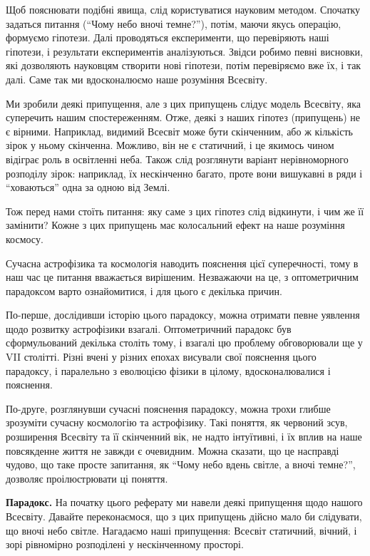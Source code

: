 \documentclass[a4paper]{article}
\begin{document}
Щоб пояснювати подібні явища, слід користуватися науковим методом. Спочатку задаться питання (``Чому небо вночі темне?''), потім, маючи якусь операцію, формуємо гіпотези. Далі проводяться експерименти, що перевіряють наші гіпотези, і результати експериментів аналізуються. Звідси робимо певні висновки, які дозволяють науковцям створити нові гіпотези, потім перевіряємо вже їх, і так далі. Саме так ми вдосконалюємо наше розуміння Всесвіту.

Ми зробили деякі припущення, але з цих припущень слідує модель Всесвіту, яка суперечить нашим спостереженням. Отже, деякі з наших гіпотез (припущень) не є вірними. Наприклад, видимий Всесвіт може бути скінченним, або ж кількість зірок у ньому скінченна. Можливо, він не є статичний, і це якимось чином відіграє роль в освітленні неба. Також слід розглянути варіант нерівноморного розподілу зірок: наприклад, їх нескінченно багато, проте вони вишукавні в ряди і ``ховаються'' одна за одною від Землі. \cite{relativityFAQ}

Тож перед нами стоїть питання: яку саме з цих гіпотез слід відкинути, і чим же її замінити? Кожне з цих припущень має колосальний ефект на наше розуміння космосу.

Сучасна астрофізика та космологія наводить пояснення цієї суперечності, тому в наш час це питання вважається вирішеним. Незважаючи на це, з оптометричним парадоксом варто ознайомитися, і для цього є декілька причин. 

По-перше, дослідивши історію цього парадоксу, можна отримати певне уявлення щодо розвитку астрофізики взагалі. Оптометричний парадокс був сформульований декілька століть тому, і взагалі цю проблему обговорювали ще у VII столітті. \cite{essential} Різні вчені у різних епохах висували свої пояснення цього парадоксу, і паралельно з еволюцією фізики в цілому, вдосконалювалися і пояснення.

По-друге, розглянувши сучасні пояснення парадоксу, можна трохи глибше зрозуміти сучасну космологію та астрофізику. Такі поняття, як червоний зсув, розширення Всесвіту та її скінченний вік, не надто інтуїтивні, і їх вплив на наше повсякденне життя не завжди є очевидним. Можна сказати, що це насправді чудово, що таке просте запитання, як ``Чому небо вдень світле, а вночі темне?'', дозволяє проілюстрювати ці поняття. \cite{introduction}

\textbf{Парадокс.}
На початку цього реферату ми навели деякі припущення щодо нашого Всесвіту. Давайте переконаємося, що з цих припущень дійсно мало би слідувати, що вночі небо світле. Нагадаємо наші припущення: Всесвіт статичний, вічний, і зорі рівномірно розподілені у нескінченному просторі. 
\end{document}
